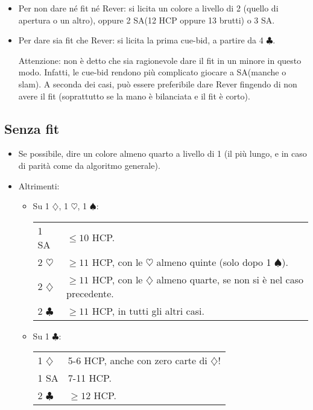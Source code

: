 \documentclass[a4paper,10pt]{article}
\renewcommand{\c}{$\clubsuit$\xspace}
\renewcommand{\d}{$\diamondsuit$\xspace}
\newcommand{\h}{$\heartsuit$\xspace}
\newcommand{\s}{$\spadesuit$\xspace}
\newcommand{\sa}{SA\xspace}
\newcommand{\smallspace}{\vskip0.3cm}
\newenvironment{twocol}
  {\smallspace\noindent\begin{tabular}{l p{0.78\textwidth}}}
  {\end{tabular}\smallspace}
\begin{document}
\begin{itemize}
\begin{itemize}
  \item Per non dare né fit né Rever: si licita un colore a livello di 2 (quello di apertura o un altro), oppure 2 \sa (12 HCP oppure 13 brutti) o 3 \sa.
  
  \item Per dare sia fit che Rever: si licita la prima cue-bid, a partire da 4 \c.
  
  Attenzione: non è detto che sia ragionevole dare il fit in un minore in questo modo. Infatti, le cue-bid rendono più complicato giocare a \sa (manche o slam). A seconda dei casi, può essere preferibile dare Rever fingendo di non avere il fit (soprattutto se la mano è bilanciata e il fit è corto).
 \end{itemize}

\end{itemize}


\subsection{Senza fit}

\begin{itemize}
 \item Se possibile, dire un colore almeno quarto a livello di 1 (il pi\`u lungo, e in caso di parit\`a come da algoritmo generale).
 \item Altrimenti:
 \begin{itemize}
  \item Su 1 \d, 1 \h, 1 \s:
  \begin{twocol}
    1 \sa & $\leq 10$ HCP.\\
    2 \h & $\geq 11$ HCP, con le \h almeno quinte (solo dopo 1 \s).\\
    2 \d & $\geq 11$ HCP, con le \d almeno quarte, se non si è nel caso precedente.\\
    2 \c & $\geq 11$ HCP, in tutti gli altri casi.\\
  \end{twocol}
  \item Su 1 \c:
  \begin{twocol}
    1 \d & 5-6 HCP, anche con zero carte di \d!\\
    1 \sa & 7-11 HCP.\\
    2 \c & $\geq 12$ HCP.\\
   \end{twocol}
 \end{itemize}
\end{itemize}
\end{document}
